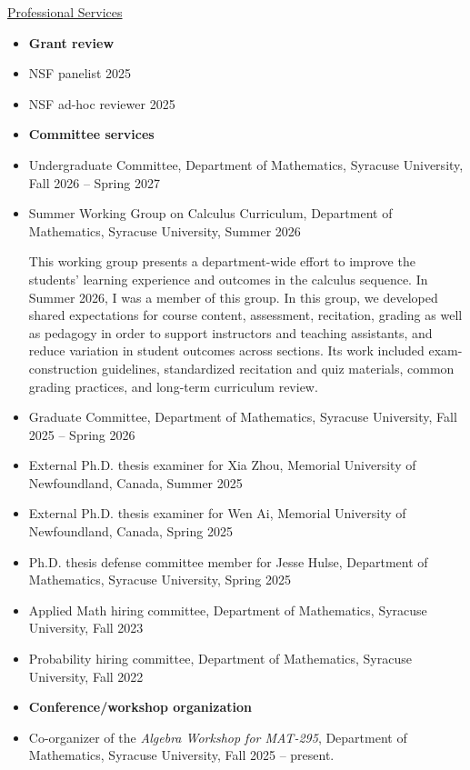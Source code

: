\documentclass[12pt]{article}
\theoremstyle{plain} \numberwithin{equation}{section}
\theoremstyle{definition}
\newcommand{\cvsection}[1]{%
  \Needspace{6\baselineskip}%
  \par\addvspace{0.8\baselineskip}%
  \noindent\underline{#1}\par\nobreak
  \vspace{0.3\baselineskip}%
}
\newcounter{list}
\begin{document}
\cvsection{Professional Services}

\begin{itemize}

		\item[] \textbf{Grant review}
	\item NSF panelist 2025
	\item NSF ad-hoc reviewer 2025
		\item[]\textbf{Committee services}
		\item Undergraduate Committee, Department of Mathematics, Syracuse University, Fall 2026 -- Spring 2027
	\item Summer Working Group on Calculus Curriculum, Department of Mathematics, Syracuse University, Summer 2026

	This working group presents a department-wide effort to improve the students' learning experience and outcomes in the calculus sequence. In Summer 2026, I was a member of this group. In this group, we developed shared expectations for course content, assessment, recitation, grading as well as pedagogy in order to support instructors and teaching assistants, and reduce variation in student outcomes across sections. Its work included exam-construction guidelines, standardized recitation and quiz materials, common grading practices, and long-term curriculum review.

	\item Graduate Committee, Department of Mathematics, Syracuse University, Fall 2025 -- Spring 2026
	\item External Ph.D. thesis examiner for Xia Zhou, Memorial University of Newfoundland, Canada, Summer 2025
	\item External Ph.D. thesis examiner for Wen Ai, Memorial University of Newfoundland, Canada, Spring 2025
	\item Ph.D. thesis defense committee member for Jesse Hulse, Department of Mathematics, Syracuse University, Spring 2025
	\item Applied Math hiring committee, Department of Mathematics, Syracuse University, Fall 2023
	\item Probability hiring committee, Department of Mathematics, Syracuse University, Fall 2022
		\item[] \textbf{Conference/workshop organization}

	\item Co-organizer of the \emph{Algebra Workshop for MAT-295}, Department of Mathematics, Syracuse University, Fall 2025 -- present.


\end{itemize}
\end{document}
